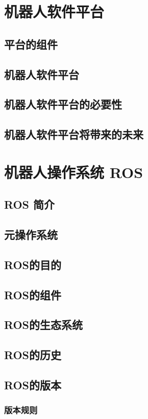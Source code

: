 \documentclass[geye,green,kindle,cn]{elegantnote}
\begin{document}
\section{机器人软件平台}
\subsection{平台的组件}
\subsection{机器人软件平台}
\subsection{机器人软件平台的必要性}
\subsection{机器人软件平台将带来的未来}
\section{机器人操作系统 ROS}
\subsection{ROS 简介}
\subsection{元操作系统}
\subsection{ROS的目的}
\subsection{ROS的组件}
\subsection{ROS的生态系统}
\subsection{ROS的历史}
\subsection{ROS的版本}
\subsubsection{版本规则}
\end{document}
